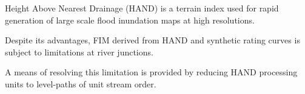 

%
\begin{keypoints}
\item Height Above Nearest Drainage (HAND) is a terrain index used for rapid generation of large scale flood inundation maps at high resolutions.
\item Despite its advantages, FIM derived from HAND and synthetic rating curves is subject to limitations at river junctions.
\item A means of resolving this limitation is provided by reducing HAND processing units to level-paths of unit stream order.
\end{keypoints}
%
